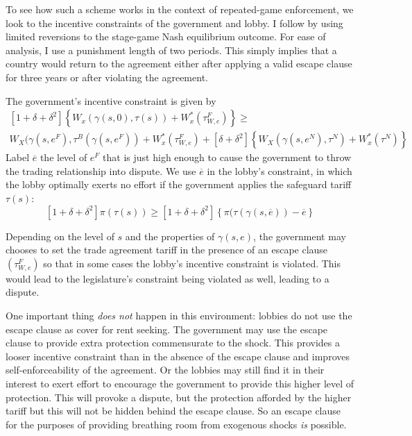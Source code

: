\documentclass[12pt]{article}
\newcommand{\ov}{\overline}
\newcommand{\ga}{\gamma}
\newcommand{\de}{\delta}
\begin{document}
To see how such a scheme works in the context of repeated-game enforcement, we look to the incentive constraints of the government and lobby. I follow \Textcite{buzard2013a} by using limited reversions to the stage-game Nash equilibrium outcome. For ease of analysis, I use a punishment length of two periods. This simply implies that a country would return to the agreement either after applying a valid escape clause for three years or after violating the agreement.

The government's incentive constraint is given by
  \begin{multline}
    \left[1+ \de +\de^2 \right] \left\{W_x(\ga(s,0),\tau(s)) + W_x^*(\tau^F_{W,e}) \right\} \geq \\ W_X(\ga(s,e^F),\tau^B(\ga(s,e^F)) + W_x^*(\tau^F_{W,e}) + \left[\de +\de^2 \right] \left\{W_X(\ga(s,e^N),\tau^N) + W_x^*(\tau^N) \right\}
		\label{exp:govincentEC}
  \end{multline}
Label $\ov{e}$ the level of $e^F$ that is just high enough to cause the government to throw the trading relationship into dispute. We use $\ov{e}$ in the lobby's constraint, in which the lobby optimally exerts no effort if the government applies the safeguard tariff $\tau(s)$:
\begin{equation}
  \left[1+ \de +\de^2 \right] \pi(\tau(s)) \geq \left[1+ \de +\de^2 \right] \left\{\pi(\tau(\ga(s,\ov{e})) - \ov{e} \right\}
	\label{exp:lobbyEC}
\end{equation}

Depending on the level of $s$ and the properties of $\ga(s,e)$, the government may chooses to set the trade agreement tariff in the presence of an escape clause $\left(\tau^F_{W,e}\right)$ so that in some cases the lobby's incentive constraint is violated. This would lead to the legislature's constraint being violated as well, leading to a dispute. 

One important thing \textit{does not} happen in this environment: lobbies do not use the escape clause as cover for rent seeking. The government may use the escape clause to provide extra protection commensurate to the shock. This provides a looser incentive constraint than in the absence of the escape clause and improves self-enforceability of the agreement. Or the lobbies may still find it in their interest to exert effort to encourage the government to provide this higher level of protection. This will provoke a dispute, but the protection afforded by the higher tariff but this will not be hidden behind the escape clause. So an escape clause for the purposes of providing breathing room from exogenous shocks \textit{is} possible.
\end{document}
